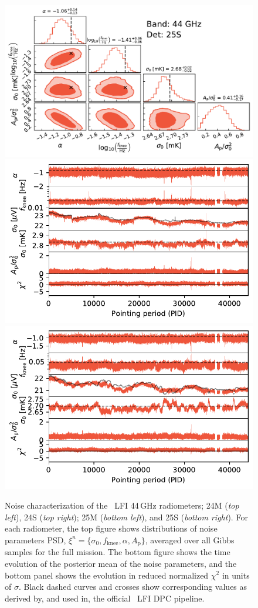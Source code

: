 \documentclass{aa}
\begin{document}
\begin{figure}[p]
\begin{center}
                \includegraphics[width=0.495\linewidth]{figs/corner_band_044_det_4_mean_new.pdf}\\
                \includegraphics[width=0.495\linewidth]{figs/xi_vs_pid_band_044_det_3_mean_new.pdf}
                \includegraphics[width=0.495\linewidth]{figs/xi_vs_pid_band_044_det_4_mean_new.pdf}
                 \vspace*{-5.8mm}            
        \end{center}
        
        \caption{Noise characterization of the \Planck\ LFI 44\,GHz
                radiometers; 24M (\emph{top left}), 24S (\emph{top right}); 25M
                (\emph{bottom left}), and 25S (\emph{bottom right}). For each
                radiometer, the top figure shows distributions of noise parameters
                PSD, $\xi^n = \{\sigma_0, f_\mathrm{knee}, \alpha, A_\mathrm{p}\}$, averaged
                over all Gibbs samples for the full mission. The bottom figure
                shows the time evolution of the posterior mean of the noise
                parameters, and the bottom panel shows the evolution in reduced
                normalized $\chi^2$ in units of $\sigma$. Black dashed curves and crosses show corresponding values as derived by, and used in, the
                official \Planck\ LFI DPC pipeline.
                \label{fig:xi_prop_44}}
\end{figure}
\end{document}
